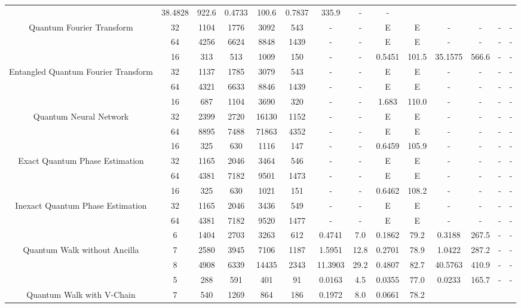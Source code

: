 \begin{table}[htb]
{\begin{tabular}{|c|c|c|c|c|c|c|c|c|c|c|c|c|c|}
 & 38.4828 & 922.6
 & 0.4733 & 100.6
 & 0.7837 & 335.9
 & - & -
 \\
Quantum Fourier Transform & 
32 & 1104 & 1776 & 3092 & 543
 & - & -
 & E & E
 & - & -
 & - & -
 \\
 & 
64 & 4256 & 6624 & 8848 & 1439
 & - & -
 & E & E
 & - & -
 & - & -
 \\
\hline
 & 
16 & 313 & 513 & 1009 & 150
 & - & -
 & 0.5451 & 101.5
 & 35.1575 & 566.6
 & - & -
 \\
Entangled Quantum Fourier Transform & 
32 & 1137 & 1785 & 3079 & 543
 & - & -
 & E & E
 & - & -
 & - & -
 \\
 & 
64 & 4321 & 6633 & 8846 & 1439
 & - & -
 & E & E
 & - & -
 & - & -
 \\
\hline
 & 
16 & 687 & 1104 & 3690 & 320
 & - & -
 & 1.683 & 110.0
 & - & -
 & - & -
 \\
Quantum Neural Network & 
32 & 2399 & 2720 & 16130 & 1152
 & - & -
 & E & E
 & - & -
 & - & -
 \\
 & 
64 & 8895 & 7488 & 71863 & 4352
 & - & -
 & E & E
 & - & -
 & - & -
 \\
\hline
 & 
16 & 325 & 630 & 1116 & 147
 & - & -
 & 0.6459 & 105.9
 & - & -
 & - & -
 \\
Exact Quantum Phase Estimation & 
32 & 1165 & 2046 & 3464 & 546
 & - & -
 & E & E
 & - & -
 & - & -
 \\
 & 
64 & 4381 & 7182 & 9501 & 1473
 & - & -
 & E & E
 & - & -
 & - & -
 \\
\hline
 & 
16 & 325 & 630 & 1021 & 151
 & - & -
 & 0.6462 & 108.2
 & - & -
 & - & -
 \\
Inexact Quantum Phase Estimation & 
32 & 1165 & 2046 & 3436 & 549
 & - & -
 & E & E
 & - & -
 & - & -
 \\
 & 
64 & 4381 & 7182 & 9520 & 1477
 & - & -
 & E & E
 & - & -
 & - & -
 \\
\hline
 & 
6 & 1404 & 2703 & 3263 & 612
 & 0.4741 & 7.0
 & 0.1862 & 79.2
 & 0.3188 & 267.5
 & - & -
 \\
Quantum Walk without Ancilla & 
7 & 2580 & 3945 & 7106 & 1187
 & 1.5951 & 12.8
 & 0.2701 & 78.9
 & 1.0422 & 287.2
 & - & -
 \\
 & 
8 & 4908 & 6339 & 14435 & 2343
 & 11.3903 & 29.2
 & 0.4807 & 82.7
 & 40.5763 & 410.9
 & - & -
 \\
\hline
 & 
5 & 288 & 591 & 401 & 91
 & 0.0163 & 4.5
 & 0.0355 & 77.0
 & 0.0233 & 165.7
 & - & -
 \\
Quantum Walk with V-Chain & 
7 & 540 & 1269 & 864 & 186
 & 0.1972 & 8.0
 & 0.0661 & 78.2

\end{tabular}}
\end{table}
